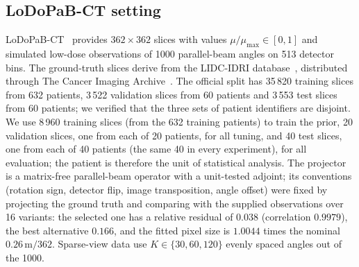 \subsection{LoDoPaB-CT setting}\label{sec:lodopab}
LoDoPaB-CT~\citep{leuschner2021} provides $362\times362$ slices with values $\mu/\mu_{\max}\in[0,1]$ and simulated low-dose observations of 1000 parallel-beam angles on 513 detector bins. The ground-truth slices derive from the LIDC-IDRI database~\citep{armato2011lidc,armato2015lidcdata},
distributed through The Cancer Imaging Archive~\citep{clark2013tcia}.
The official split has 35\,820 training slices from 632 patients, 3\,522 validation slices from 60 patients and 3\,553 test slices from 60 patients; we verified that the three sets of patient identifiers
are disjoint. We use 8\,960 training slices (from the 632 training patients) to train the prior, 20 validation slices, one from each of 20 patients, for all tuning, and 40 test slices, one from each of 40
patients (the same 40 in every experiment), for all evaluation; the patient is therefore the unit of statistical analysis.
The projector is a matrix-free parallel-beam operator with a unit-tested adjoint;
its conventions (rotation sign, detector flip, image transposition, angle offset) were fixed by projecting the ground truth and comparing with the supplied observations over 16 variants: the selected one has a relative residual of $0.038$ (correlation $0.9979$), the best alternative $0.166$,
and the fitted pixel size is $1.0044$ times the nominal $0.26\,\mathrm{m}/362$. Sparse-view data use $K\in\{30,60,120\}$ evenly spaced angles out of the 1000.


